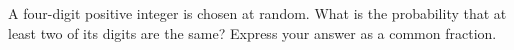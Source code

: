 A four-digit positive integer is chosen at random. What is the probability that at least two of its digits are the same? Express your answer as a common fraction.
